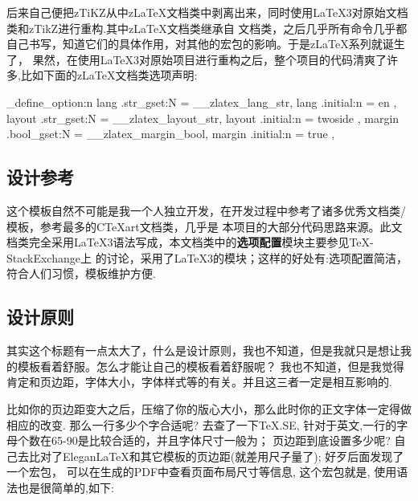 \documentclass[
    lang=cn, 
    layout=oneside, 
    margin=false, 
    math-alias=true,
]{zlatex}
\let\cmd\zlatexVerb
\begin{document}
后来自己便把zTiKZ从中z\LaTeX{}文档类中剥离出来，同时使用\LaTeX{}3对原始文档类和zTikZ进行重构.其中z\LaTeX{}文档类继承自\cmd{book}
文档类，之后几乎所有命令几乎都自己书写，知道它们的具体作用，对其他的宏包的影响。于是z\LaTeX{}系列就诞生了，
果然，在使用\LaTeX3对原始项目进行重构之后，整个项目的代码清爽了许多,比如下面的z\LaTeX{}文档类选项声明:

\begin{codeprint}
\zlatex_define_option:n {
    lang                  .str_gset:N   =  \g__zlatex_lang_str,
    lang                  .initial:n    =  { en },
    layout                .str_gset:N   =  \g__zlatex_layout_str,
    layout                .initial:n    =  { twoside },
    margin                .bool_gset:N  =  \g__zlatex_margin_bool,
    margin                .initial:n    =  { true },
}
\end{codeprint}

\subsection{设计参考}
这个模板自然不可能是我一个人独立开发，在开发过程中参考了诸多优秀文档类/模板，参考最多的{C\TeX{}art}文档类，几乎是
本项目的大部分代码思路来源。此文档类完全采用\LaTeX3语法写成，本文档类中的\textbf{选项配置}模块主要参见\TeX-StackExchange上
的讨论，采用了\LaTeX3的\cmd{key-value}模块；这样的好处有:选项配置简洁，符合人们习惯，模板维护方便.


\subsection{设计原则}
其实这个标题有一点太大了，什么是设计原则，我也不知道，但是我就只是想让我的模板看着舒服。怎么才能让自己的模板看着舒服呢？
我也不知道，但是我觉得肯定和页边距，字体大小，字体样式等的有关。并且这三者一定是相互影响的. 

比如你的页边距变大之后，压缩了你的版心大小，那么此时你的正文字体一定得做相应的改变. 那么一行多少个字合适呢?
去查了一下\TeX.SE, 针对于英文,一行的字母个数在65-90是比较合适的，并且字体尺寸一般为\cmd{10pt,11pt,12pt}；
页边距到底设置多少呢? 自己去比对了Elegan\LaTeX{}和其它模板的页边距(就差用尺子量了); 好歹后面发现了一个宏包，
可以在生成的PDF中查看页面布局尺寸等信息, 这个宏包就是\cmd{fgruler}, 使用语法也是很简单的,如下:

\begin{codeprint}
\usepackage[hshift=0mm,vshift=0mm]{fgruler}
\end{codeprint}
\end{document}
